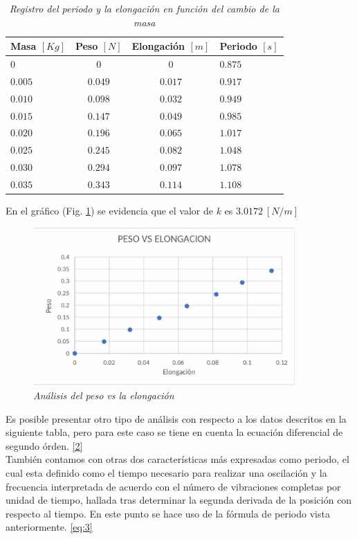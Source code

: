 \documentclass[spanish,notitlepage,letterpaper, 12pt]{article}
\begin{document}
\begin{table}[h]
    \centering
    \begin{tabular}{l|c|c|l}
        Masa $[Kg]$ & Peso $[N]$ & Elongación $[m]$ & Periodo $[s]$ \\
        \hline \hline
        $0$ & $0$ & $0$ & $0.875$\\
        $0.005$ & $0.049$ & $0.017$ & $0.917$\\
        $0.010$ & $0.098$ & $0.032$ & $0.949$\\
        $0.015$ & $0.147$ & $0.049$ & $0.985$\\
        $0.020$ & $0.196$ & $0.065$ & $1.017$\\
        $0.025$ & $0.245$ & $0.082$ & $1.048$\\
        $0.030$ & $0.294$ & $0.097$ & $1.078$\\
        $0.035$ & $0.343$ & $0.114$ & $1.108$\\
    \end{tabular}
    \caption{\textit{Registro del periodo y la elongación en función del cambio de la masa}}
    \label{Table 1}
\end{table}
En el gráfico (Fig. \ref{Figura 2}) se evidencia que el valor de $k$ es $3.0172 \ [N/m]$
\newpage
\begin{figure}[h]
    \centering
    \includegraphics[width=10.0cm]{images/peso-vs-elongacion.png}
    \caption{\textit{Análisis del peso vs la elongación}}
    \label{Figura 2}
\end{figure}
Es posible presentar otro tipo de análisis con respecto a los datos descritos en la siguiente tabla, pero para este caso se tiene en cuenta la ecuación diferencial de segundo órden. \eqref{2}\\

También contamos con otras dos características más expresadas como periodo, el cual esta definido como el tiempo necesario para realizar una oscilación y la frecuencia interpretada de acuerdo con el número de vibraciones completas por unidad de tiempo, hallada tras determinar la segunda derivada de
la posición con respecto al tiempo. En este punto se hace uso de la fórmula de periodo vista anteriormente. \eqref{eq:3}\\
\end{document}
